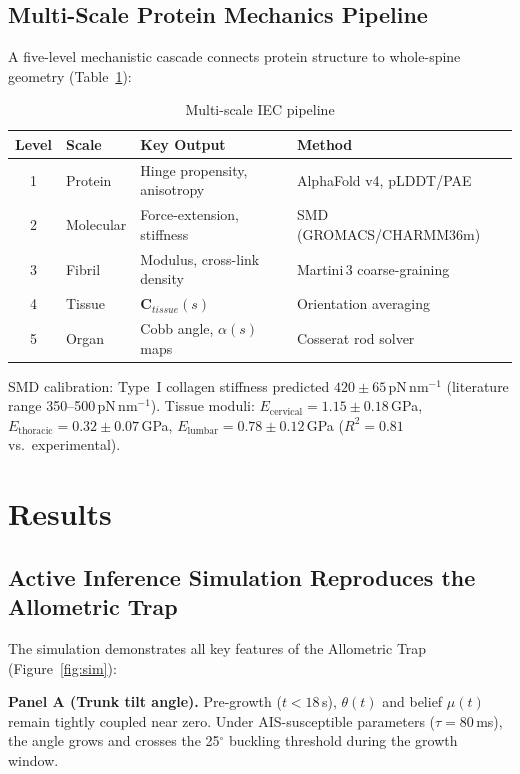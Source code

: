 \documentclass[12pt, letterpaper]{article}
\begin{document}
\subsection{Multi-Scale Protein Mechanics Pipeline}

A five-level mechanistic cascade connects protein structure to whole-spine
geometry (Table~\ref{tab:pipeline}):

\begin{table}[H]
  \centering
  \caption{Multi-scale IEC pipeline}
  \label{tab:pipeline}
  \renewcommand{\arraystretch}{1.3}
  \begin{tabular}{clll}
    \toprule
    Level & Scale & Key Output & Method \\
    \midrule
    1 & Protein & Hinge propensity, anisotropy & AlphaFold v4, pLDDT/PAE \\
    2 & Molecular & Force-extension, stiffness & SMD (GROMACS/CHARMM36m) \\
    3 & Fibril & Modulus, cross-link density & Martini\,3 coarse-graining \\
    4 & Tissue & $\mathbf{C}_{tissue}(s)$ & Orientation averaging \\
    5 & Organ & Cobb angle, $\alpha(s)$ maps & Cosserat rod solver \\
    \bottomrule
  \end{tabular}
\end{table}

\noindent SMD calibration: Type~I collagen stiffness predicted $420\pm65$\,pN\,nm$^{-1}$
(literature range 350--500\,pN\,nm$^{-1}$). Tissue moduli:
$E_{\mathrm{cervical}} = 1.15\pm0.18$\,GPa,
$E_{\mathrm{thoracic}} = 0.32\pm0.07$\,GPa,
$E_{\mathrm{lumbar}} = 0.78\pm0.12$\,GPa
($R^{2}=0.81$ vs.\ experimental).

\section{Results}

\subsection{Active Inference Simulation Reproduces the Allometric Trap}

The simulation demonstrates all key features of the Allometric Trap
(Figure~\ref{fig:sim}):

\textbf{Panel A (Trunk tilt angle).} Pre-growth ($t < 18$\,s), $\theta(t)$
and belief $\mu(t)$ remain tightly coupled near zero. Under
AIS-susceptible parameters ($\tau = 80$\,ms), the angle grows and crosses the
25$^{\circ}$ buckling threshold during the growth window.
\end{document}
